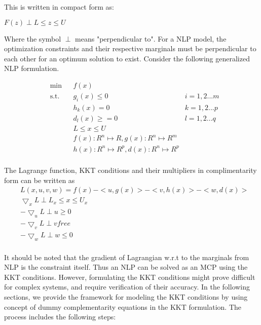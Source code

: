 \documentclass{article}
\begin{document}
\noindent This is written in compact form as:
\centerline{ $ F(z) \perp L \leq z \leq U $ }
\par
\noindent Where the symbol $\perp$ means "perpendicular to". For a NLP model, the optimization constraints and their respective marginals must be
perpendicular to each other for an optimum solution to exist. Consider the following generalized NLP formulation.

\begin{equation}
\begin{aligned}
&	\min
& & f(x) \\
& \text{s.t.} & & 	 g_{i}(x) \leqslant 0	&	i = 1,2...m \\
& & &			h_{k}(x) = 0	 &	k = 1,2...p \\
& & &			d_{l}(x) \geqslant =0		&	l = 1,2...q \\
& & &			L \leq x \leq U \\
& & &			f(x): {\!R}^n \mapsto \!R , g(x): {\!R}^n \mapsto {\!R}^m\\
& & &			h(x): {\!R}^n \mapsto {\!R}^ p , d(x): {\!R}^n \mapsto {\!R}^ p\\
\end{aligned}
\end{equation}

\noindent The Lagrange function, KKT conditions and their multipliers in complimentarity form can be written as \\

\begin{equation}
\begin{aligned}
& L(x,u,v,w) = f(x) - <u,g(x)> - <v,h(x)> - <w,d(x)>  \\
& \bigtriangledown_x L  \perp L_x \leq x \leq U_x 	\\
& - \bigtriangledown_u L  \perp u \geq 0	\\
& -\bigtriangledown_v L  \perp v free	\\
& -\bigtriangledown_w L  \perp w \leq 0	\\
\end{aligned}
\end{equation}

\noindent It should be noted that the gradient of Lagrangian w.r.t to the marginals from NLP is the constraint itself. Thus an NLP can be solved as an MCP
using the KKT conditions. However, formulating the KKT conditions might prove difficult for complex systems, and require verification of their accuracy.
In the following sections, we provide the framework for modeling the KKT conditions  by using concept of dummy complementarity equations in the KKT formulation.
The process includes the following steps:
\end{document}
